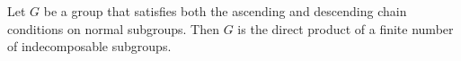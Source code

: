 Let $G$ be a group that satisfies both the ascending and descending chain conditions on normal subgroups. Then $G$ is the direct product of a finite number of indecomposable subgroups.
